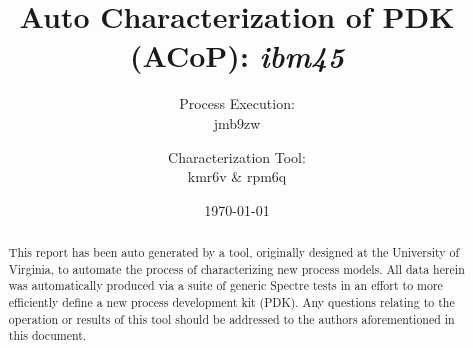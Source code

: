 \documentclass[letterpaper]{article}
\title{Auto Characterization of PDK (ACoP): \emph{ibm45}}
\author{Process Execution: \\jmb9zw \and Characterization Tool: \\kmr6v \& rpm6q}
\date{\today}
\begin{document}


\maketitle
\begin{abstract}
This report has been auto generated by a tool, originally designed at the University of Virginia, to automate the process of characterizing new process models. All data herein was automatically produced via a suite of generic Spectre tests in an effort to more efficiently define a new process development kit (PDK). Any questions relating to the operation or results of this tool should be addressed to the authors aforementioned in this document.
\end{abstract}

\newpage
\listoffigures 
\newpage
\end{document}
